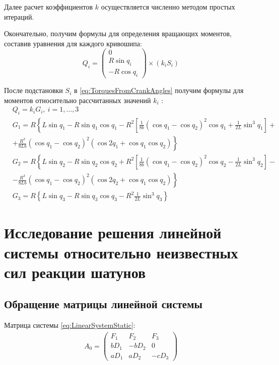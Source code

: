 Далее расчет коэффициентов $k$ осуществляется численно методом простых итераций.

Окончательно, получим формулы для определения вращающих моментов, составив уравнения для каждого кривошипа:
\begin{equation}
\label{eq:TorquesFromCrankAngles}
Q_i  = \begin{pmatrix}
0 \\ R\sin{q_i} \\ -R\cos{q_i}
\end{pmatrix} \times
\left(k_iS_i\right)
\end{equation}

После подстановки $S_i$ в \ref{eq:TorquesFromCrankAngles} получим формулы для моментов относительно рассчитанных значений $k_i$ :
\begin{equation}
\label{eq:TorquesFromCrankAnglesDetailed}
\begin{aligned}
& Q_i = k_iG_i,~i=1,\dots,3 \\
& G_1 = R \left\{ L\sin{q_1}-R\sin{q_1}\cos{q_1}-R^2 \left[ \frac{1}{8b} {\left( \cos{q_1}-\cos{q_2} \right)}^2 \cos{q_1} + \frac{1}{2L}\sin^3{q_1} \right] \right. +\\
& \left.+ \frac{R^3}{8Lb} \left( \cos{q_1}-\cos{q_2} \right)^2 \left(\cos{2q_1}+\cos{q_1}\cos{q_2}\right)
\right\} \\
& G_2 = R \left\{ L\sin{q_2}-R\sin{q_2}\cos{q_2}+R^2 \left[ \frac{1}{8b} {\left( \cos{q_1}-\cos{q_2} \right)}^2 \cos{q_2} - \frac{1}{2L}\sin^3{q_2} \right] \right. -\\
& \left.- \frac{R^3}{8Lb} \left( \cos{q_1}-\cos{q_2} \right)^2 \left(\cos{2q_2}+\cos{q_1}\cos{q_2}\right)
\right\} \\
& G_3 = R\left\{L\sin{q_3}-R\sin{q_3}\cos{q_3}-R^2\frac{1}{2L}\sin^3q_3\right\}
\end{aligned}
\end{equation}

\section{Исследование решения линейной системы относительно неизвестных сил реакции шатунов}

\subsection{Обращение матрицы линейной системы}
Матрица системы \ref{eq:LinearSystemStatic}:
\begin{equation}
\begin{aligned}
	A_0 =
	\begin{pmatrix}
	F_1 & F_2 & F_3 \\
	bD_1 & -bD_2 & 0 \\
	aD_1 & aD_2 & -cD_3
	\end{pmatrix}
\end{aligned}
\end{equation}

